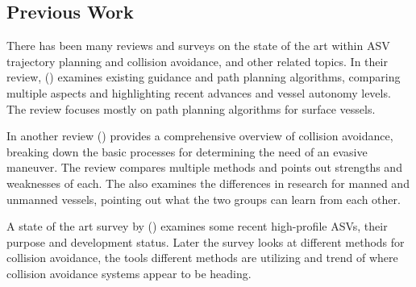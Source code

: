 \subsection{Previous Work}

There has been many reviews and surveys on the state of the art within \gls{ASV} trajectory planning and collision avoidance, and other
related topics. In their review, (\cite{vagale2021path}) examines existing guidance and path planning algorithms, comparing multiple aspects and highlighting
recent advances and vessel autonomy levels. The review focuses mostly on path planning algorithms for surface vessels.

In another review (\cite{huang2020ship}) provides a comprehensive overview of collision avoidance, breaking down the basic processes
for determining the need of an evasive maneuver. The review compares multiple methods and points out strengths and weaknesses of each.
The also examines the differences in research for manned and unmanned vessels, pointing out what the two groups can learn from each other.

A state of the art survey by (\cite{zhang2021collision}) examines some recent high-profile \gls{ASV}s, their purpose and development status. Later
the survey looks at different methods for collision avoidance, the tools different methods are utilizing and trend of where collision
avoidance systems appear to be heading.

